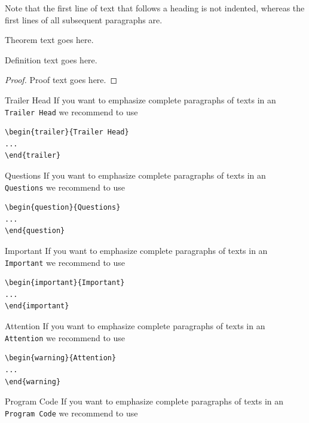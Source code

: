 \documentclass[graybox]{svmult}
\begin{document}
{Note that the first line of text that follows a heading is not indented, whereas the first lines of all subsequent paragraphs are.
%
%
\begin{theorem}
Theorem text goes here.
\end{theorem}
%
\begin{definition}
Definition text goes here.
\end{definition}
%
\begin{proof}
Proof text goes here.
\end{proof}
%
\begin{trailer}{Trailer Head}
If you want to emphasize complete paragraphs of texts in an \verb|Trailer Head| we recommend to
use  \begin{verbatim}\begin{trailer}{Trailer Head}
...
\end{trailer}\end{verbatim}
\end{trailer}
%
\begin{question}{Questions}
If you want to emphasize complete paragraphs of texts in an \verb|Questions| we recommend to
use  \begin{verbatim}\begin{question}{Questions}
...
\end{question}\end{verbatim}
\end{question}
\eject%
\begin{important}{Important}
If you want to emphasize complete paragraphs of texts in an \verb|Important| we recommend to
use  \begin{verbatim}\begin{important}{Important}
...
\end{important}\end{verbatim}
\end{important}
%
\begin{warning}{Attention}
If you want to emphasize complete paragraphs of texts in an \verb|Attention| we recommend to
use  \begin{verbatim}\begin{warning}{Attention}
...
\end{warning}\end{verbatim}
\end{warning}

\begin{programcode}{Program Code}
If you want to emphasize complete paragraphs of texts in an \verb|Program Code| we recommend to
use


\end{programcode}}
\end{document}
